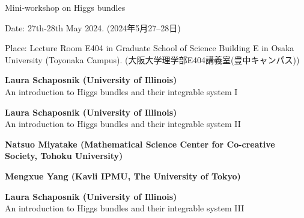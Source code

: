 \documentclass[dvipdfmx,a4paper,12pt]{article}
\theoremstyle{plain} %
\theoremstyle{definition} %
\begin{document}
\begin{center}
  {\Huge Mini-workshop on Higgs bundles}
 

  \end{center}
  
\vskip5mm
\begin{flushleft}
{ Date: 27th-28th May 2024. (2024年5月27--28日)}


{Place: Lecture Room E404 in Graduate School of Science Building E in Osaka University (Toyonaka Campus).}
{(大阪大学理学部E404講義室(豊中キャンパス))}

\end{flushleft}




\vskip3mm

\vskip3mm
\vskip1mm
{\bf Laura Schaposnik (University of Illinois)}\\
\hspace{11pt} An introduction to Higgs bundles and their integrable system I

{\bf Laura Schaposnik (University of Illinois)}\\
\hspace{11pt} An introduction to Higgs bundles and their integrable system II

{\bf Natsuo Miyatake (Mathematical Science Center for Co-creative Society, Tohoku University)}\\
\hspace{11pt}

{\bf Mengxue Yang (Kavli IPMU, The University of Tokyo)}\\
\hspace{11pt}

\vskip1mm
{\bf Laura Schaposnik (University of Illinois)}\\
\hspace{11pt} An introduction to Higgs bundles and their integrable system III
\end{document}
